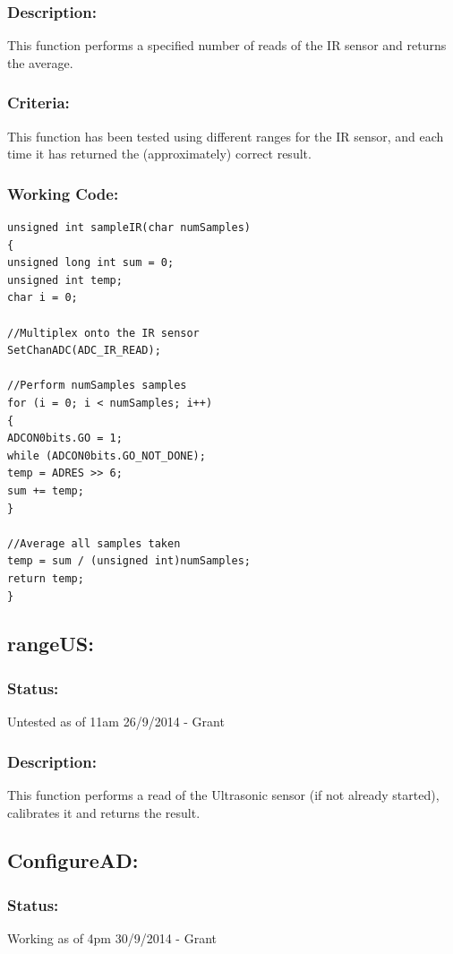 \documentclass[]{report}
\begin{document}
\subsubsection{Description:}
This function performs a specified number of reads of the IR sensor and returns the average.

\subsubsection{Criteria:}
This function has been tested using different ranges for the IR sensor, and each time it has returned the (approximately) correct result.

\subsubsection{Working Code:}
\begin{lstlisting}
unsigned int sampleIR(char numSamples)
{
unsigned long int sum = 0;
unsigned int temp;
char i = 0;

//Multiplex onto the IR sensor
SetChanADC(ADC_IR_READ);

//Perform numSamples samples
for (i = 0; i < numSamples; i++)
{
ADCON0bits.GO = 1;
while (ADCON0bits.GO_NOT_DONE);
temp = ADRES >> 6;
sum += temp;
}

//Average all samples taken
temp = sum / (unsigned int)numSamples;
return temp;
}
\end{lstlisting}

\subsection{rangeUS:}
\subsubsection{Status:}
Untested as of 11am 26/9/2014 - Grant

\subsubsection{Description:}
This function performs a read of the Ultrasonic sensor (if not already started), calibrates it and returns the result.

\subsection{ConfigureAD:}
\subsubsection{Status:}
Working as of 4pm 30/9/2014 - Grant
\end{document}
